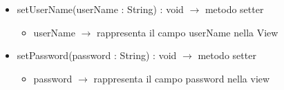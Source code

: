 \begin{description}
\begin{itemize}
	\item setUserName(userName : String) : void $\rightarrow$ metodo setter\begin{itemize}
		\item userName $\rightarrow$ rappresenta il campo userName nella View
	\end{itemize}
	
	\item setPassword(password : String) : void $\rightarrow$ metodo setter\begin{itemize}
		\item password $\rightarrow$ rappresenta il campo password nella view
	\end{itemize}
	
\end{itemize}

\end{description}

